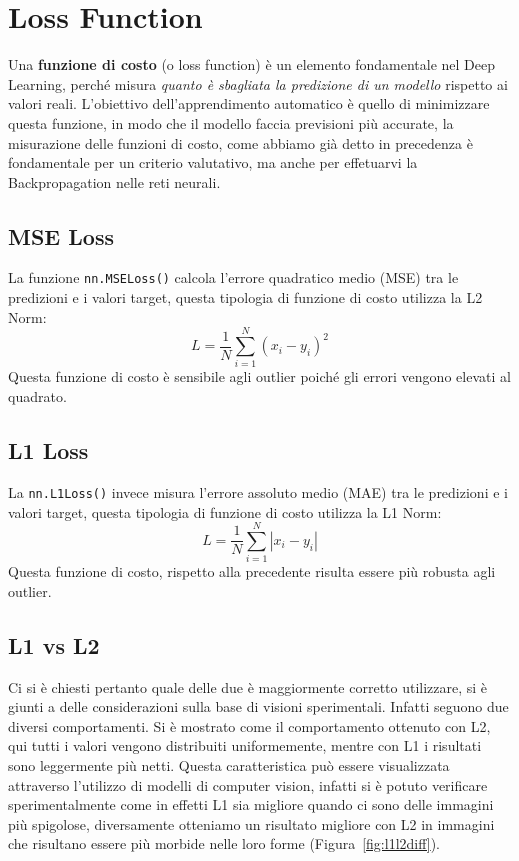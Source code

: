 \chapter{Loss Function}
Una \textbf{funzione di costo} (o loss function) è un elemento fondamentale nel Deep Learning, perché misura \textit{quanto è sbagliata la predizione di un modello} rispetto ai valori reali. L'obiettivo dell'apprendimento automatico è quello di minimizzare questa funzione, in modo che il modello faccia previsioni più accurate, la misurazione delle funzioni di costo, come abbiamo già detto in precedenza è fondamentale per un criterio valutativo, ma anche per effetuarvi la Backpropagation nelle reti neurali.
\section{MSE Loss}
La funzione \texttt{nn.MSELoss()} calcola l'errore quadratico medio (MSE) tra le predizioni e i valori target, questa tipologia di funzione di costo utilizza la L2 Norm:
\begin{equation}
L = \frac{1}{N} \sum_{i=1}^{N} (x_i - y_i)^2
\end{equation}
Questa funzione di costo è sensibile agli outlier poiché gli errori vengono elevati al quadrato.
\section{L1 Loss}
La \texttt{nn.L1Loss()} invece misura l'errore assoluto medio (MAE) tra le predizioni e i valori target, questa tipologia di funzione di costo utilizza la L1 Norm:
\begin{equation}
L = \frac{1}{N} \sum_{i=1}^{N} |x_i - y_i|
\end{equation}
Questa funzione di costo, rispetto alla precedente risulta essere più robusta agli outlier.
\section{L1 vs L2}
Ci si è chiesti pertanto quale delle due è maggiormente corretto utilizzare, si è giunti a delle considerazioni sulla base di visioni sperimentali. Infatti seguono due diversi comportamenti. Si è mostrato come il comportamento ottenuto con L2, qui tutti i valori vengono distribuiti uniformemente, mentre con L1 i risultati sono leggermente più netti. Questa caratteristica può essere visualizzata attraverso l'utilizzo di modelli di computer vision, infatti si è potuto verificare sperimentalmente come in effetti L1 sia migliore quando ci sono delle immagini più spigolose, diversamente otteniamo un risultato migliore con L2 in immagini che risultano essere più morbide nelle loro forme (Figura~\ref{fig:l1l2diff}).

